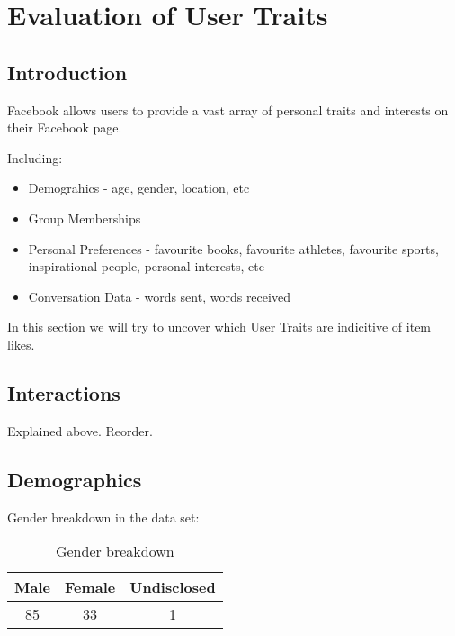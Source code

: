 
\chapter{Evaluation of User Traits}
\label{cha:ivg}

\section{Introduction}
\label{sec:AFintro}

Facebook allows users to provide a vast array of personal traits and interests on their Facebook page. 

Including:
\begin{itemize}
\item Demograhics - age, gender, location, etc
\item Group Memberships
\item Personal Preferences - favourite books, favourite athletes, favourite sports, inspirational people, personal interests, etc
\item Conversation Data - words sent, words received
\end{itemize}

In this section we will try to uncover which User Traits are indicitive of item likes.

\section{Interactions}
\label{sec:inter}

Explained above. Reorder.

\section{Demographics}
\label{sec:demo}

Gender breakdown in the data set:


\begin{table}[!htbp]
\centering
	\begin{tabular}{|c|c|c|} %
		\hline
		\textbf{Male} & \textbf{Female} & \textbf{Undisclosed}  \\ \hline
		85 & 33 & 1 \\ \hline
	\end{tabular}
	\caption{Gender breakdown}
	\label{tab:revpol}
\end{table}

